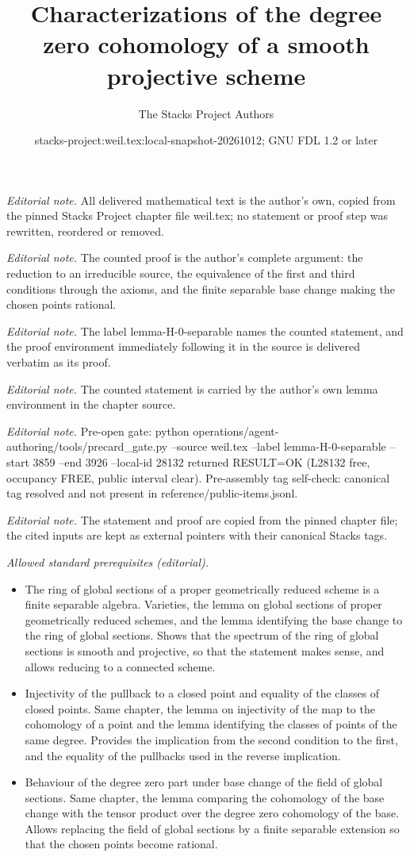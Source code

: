 \documentclass[10pt,a4paper]{amsart}
\title{Characterizations of the degree zero cohomology of a smooth projective scheme}
\author{The Stacks Project Authors}
\date{stacks-project:weil.tex:local-snapshot-20261012; GNU FDL 1.2 or later}
\theoremstyle{plain}
\theoremstyle{definition}
\theoremstyle{remark}
\numberwithin{equation}{subsection}
\begin{document}
\maketitle
\noindent\textit{Editorial note.} All delivered mathematical text is the author's own, copied from the pinned Stacks Project chapter file weil.tex; no statement or proof step was rewritten, reordered or removed.\par\medskip
\noindent\textit{Editorial note.} The counted proof is the author's complete argument: the reduction to an irreducible source, the equivalence of the first and third conditions through the axioms, and the finite separable base change making the chosen points rational.\par\medskip
\noindent\textit{Editorial note.} The label lemma-H-0-separable names the counted statement, and the proof environment immediately following it in the source is delivered verbatim as its proof.\par\medskip
\noindent\textit{Editorial note.} The counted statement is carried by the author's own lemma environment in the chapter source.\par\medskip
\noindent\textit{Editorial note.} Pre-open gate: python operations/agent-authoring/tools/precard\_gate.py --source weil.tex --label lemma-H-0-separable --start 3859 --end 3926 --local-id 28132 returned RESULT=OK (L28132 free, occupancy FREE, public interval clear). Pre-assembly tag self-check: canonical tag resolved and not present in reference/public-items.jsonl.\par\medskip
\noindent\textit{Editorial note.} The statement and proof are copied from the pinned chapter file; the cited inputs are kept as external pointers with their canonical Stacks tags.\par\medskip
\noindent\textit{Allowed standard prerequisites (editorial).}\begin{itemize}
\item The ring of global sections of a proper geometrically reduced scheme is a finite separable algebra. Varieties, the lemma on global sections of proper geometrically reduced schemes, and the lemma identifying the base change to the ring of global sections. Shows that the spectrum of the ring of global sections is smooth and projective, so that the statement makes sense, and allows reducing to a connected scheme.
\item Injectivity of the pullback to a closed point and equality of the classes of closed points. Same chapter, the lemma on injectivity of the map to the cohomology of a point and the lemma identifying the classes of points of the same degree. Provides the implication from the second condition to the first, and the equality of the pullbacks used in the reverse implication.
\item Behaviour of the degree zero part under base change of the field of global sections. Same chapter, the lemma comparing the cohomology of the base change with the tensor product over the degree zero cohomology of the base. Allows replacing the field of global sections by a finite separable extension so that the chosen points become rational.
\end{itemize}\medskip
\end{document}
